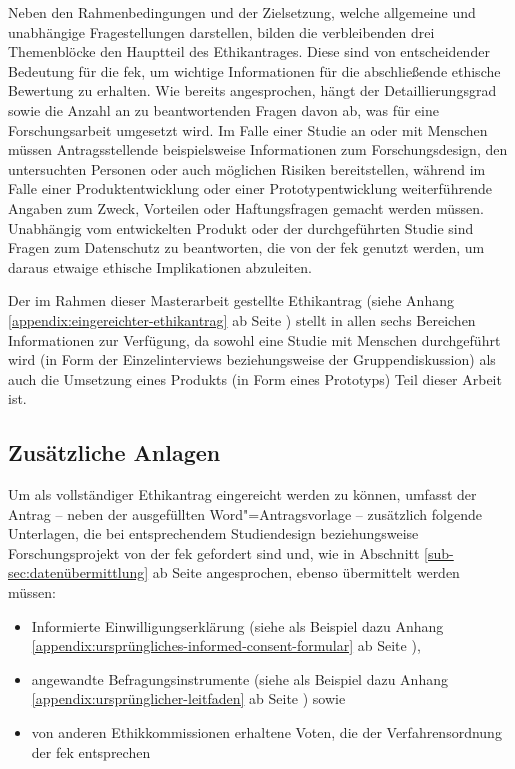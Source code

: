 \documentclass[a4paper,12pt,twoside]{scrreprt}
\begin{document}
\medskip

Neben den Rahmenbedingungen und der Zielsetzung, welche allgemeine und unabhängige Fragestellungen darstellen, bilden die verbleibenden drei Themenblöcke den Hauptteil des Ethikantrages. Diese sind von entscheidender Bedeutung für die \ac{fek}, um wichtige Informationen für die abschließende ethische Bewertung zu erhalten. Wie bereits angesprochen, hängt der Detaillierungsgrad sowie die Anzahl an zu beantwortenden Fragen davon ab, was für eine Forschungsarbeit umgesetzt wird. Im Falle einer Studie an oder mit Menschen müssen Antragsstellende beispielsweise Informationen zum Forschungsdesign, den untersuchten Personen oder auch möglichen Risiken bereitstellen, während im Falle einer Produktentwicklung oder einer Prototypentwicklung weiterführende Angaben zum Zweck, Vorteilen oder Haftungsfragen gemacht werden müssen. Unabhängig vom entwickelten Produkt oder der durchgeführten Studie sind Fragen zum Datenschutz zu beantworten, die von der \ac{fek} genutzt werden, um daraus etwaige ethische Implikationen abzuleiten.

Der im Rahmen dieser Masterarbeit gestellte Ethikantrag (siehe Anhang \ref{appendix:eingereichter-ethikantrag} ab Seite \pageref{appendix:eingereichter-ethikantrag}) stellt in allen sechs Bereichen Informationen zur Verfügung, da sowohl eine Studie mit Menschen durchgeführt wird (in Form der Einzelinterviews beziehungsweise der Gruppendiskussion) als auch die Umsetzung eines Produkts (in Form eines Prototyps) Teil dieser Arbeit ist.

\subsection{Zusätzliche Anlagen}
\label{sub-sec:inhaltlicher-aufbau-zusätzliche-anlagen}

Um als vollständiger Ethikantrag eingereicht werden zu können, umfasst der Antrag -- neben der ausgefüllten Word"=Antragsvorlage -- zusätzlich folgende Unterlagen, die bei entsprechendem Studiendesign beziehungsweise Forschungsprojekt von der \ac{fek} gefordert sind \cite{fachhochschule_vorarlberg_gmbh_forschungsethik-kommission_2021} und, wie in Abschnitt \ref{sub-sec:datenübermittlung} ab Seite \pageref{sub-sec:datenübermittlung} angesprochen, ebenso übermittelt werden müssen:
\begin{itemize}
    \item Informierte Einwilligungserklärung (siehe als Beispiel dazu Anhang \ref{appendix:ursprüngliches-informed-consent-formular} ab Seite \pageref{appendix:ursprüngliches-informed-consent-formular}),
    \item angewandte Befragungsinstrumente (siehe als Beispiel dazu Anhang \ref{appendix:ursprünglicher-leitfaden} ab Seite \pageref{appendix:ursprünglicher-leitfaden}) sowie
    \item von anderen Ethikkommissionen erhaltene Voten, die der Verfahrensordnung der \ac{fek} entsprechen
\end{itemize}
\end{document}
